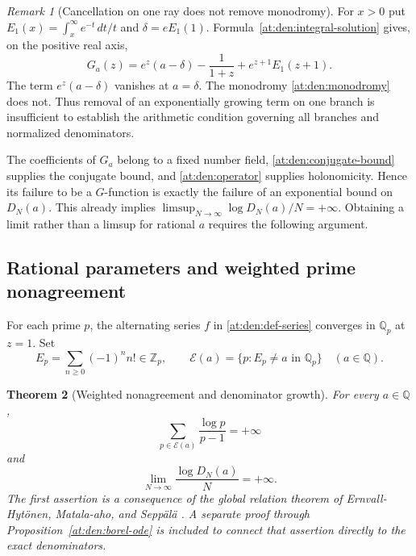 \documentclass[11pt,a4paper]{article}
\newcommand{\Q}{\mathbb Q}
\newcommand{\Z}{\mathbb Z}
\newtheorem{theorem}{Theorem}[section]
\theoremstyle{definition}
\theoremstyle{remark}
\newtheorem{remark}[theorem]{Remark}
\numberwithin{equation}{section}
\begin{document}
\begin{remark}[Cancellation on one ray does not remove monodromy]
\label{at:den:gompertz-branch}
For $x>0$ put $E_1(x)=\int_x^\infty e^{-t}\,dt/t$ and
$\delta=eE_1(1)$.  Formula~\eqref{at:den:integral-solution} gives, on the
positive real axis,
\begin{equation}\label{at:den:closed-form}
 G_a(z)=e^z(a-\delta)-\frac{1}{1+z}+e^{z+1}E_1(z+1).
\end{equation}
The term $e^z(a-\delta)$ vanishes at $a=\delta$.  The monodromy
\eqref{at:den:monodromy} does not.  Thus removal of an exponentially
growing term on one branch is insufficient to establish the arithmetic
condition governing all branches and normalized denominators.
\end{remark}

The coefficients of $G_a$ belong to a fixed number field,
\eqref{at:den:conjugate-bound} supplies the conjugate bound, and
\eqref{at:den:operator} supplies holonomicity.  Hence its failure to be a
$G$-function is exactly the failure of an exponential bound on $D_N(a)$.
This already implies
$\limsup_{N\to\infty}\log D_N(a)/N=+\infty$.
Obtaining a limit rather than a limsup for rational $a$ requires the
following argument.

\subsection{Rational parameters and weighted prime nonagreement}

For each prime $p$, the alternating series $f$ in
\eqref{at:den:def-series} converges in $\Q_p$ at $z=1$.
Set
\begin{equation}\label{at:den:epadics}
 E_p=\sum_{n\geq0}(-1)^n n!\in\Z_p,
 \qquad
 \mathcal E(a)=\{p:E_p\ne a\text{ in }\Q_p\}
 \quad(a\in\Q).
\end{equation}

\begin{theorem}[Weighted nonagreement and denominator growth]
\label{at:den:rational-growth}
For every $a\in\Q$,
\begin{equation}\label{at:den:weighted-divergence}
 \sum_{p\in\mathcal E(a)}\frac{\log p}{p-1}=+\infty
\end{equation}
and
\begin{equation}\label{at:den:superexponential}
 \lim_{N\to\infty}\frac{\log D_N(a)}{N}=+\infty.
\end{equation}
The first assertion is a consequence of the global relation theorem
of Ernvall-Hyt\"onen, Matala-aho, and Sepp\"al\"a
\cite[Theorem~1]{at:Ernvall2018}.  A separate proof through
Proposition~\ref{at:den:borel-ode} is included to connect that assertion
directly to the exact denominators.
\end{theorem}
\end{document}
